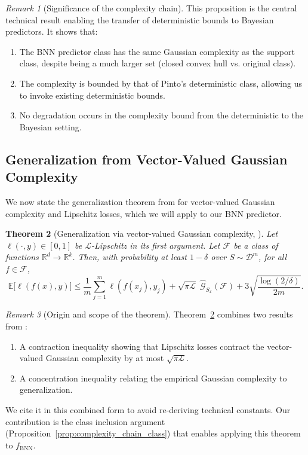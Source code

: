 \documentclass{article}
\theoremstyle{plain}
\newtheorem{theorem}{Theorem}[section]
\theoremstyle{definition}
\theoremstyle{remark}
\newtheorem{remark}[theorem]{Remark}
\begin{document}
\begin{remark}[Significance of the complexity chain]
This proposition is the central technical result enabling the transfer of deterministic bounds to Bayesian predictors. It shows that:
\begin{enumerate}
    \item The BNN predictor class has the same Gaussian complexity as the support class, despite being a much larger set (closed convex hull vs. original class).
    \item The complexity is bounded by that of Pinto's deterministic class, allowing us to invoke existing deterministic bounds.
    \item No degradation occurs in the complexity bound from the deterministic to the Bayesian setting.
\end{enumerate}
\end{remark}

\subsection{Generalization from Vector-Valued Gaussian Complexity}\label{app:gaussian_complexity:generalization}

We now state the generalization theorem from \citet{pinto2025on} for vector-valued Gaussian complexity and Lipschitz losses, which we will apply to our BNN predictor.

\begin{theorem}[Generalization via vector-valued Gaussian complexity, \citet{pinto2025on}]
\label{thm:pinto_generalization}
Let $\ell(\cdot,y)\in[0,1]$ be $\mathcal{L}$-Lipschitz in its first argument. Let $\mathcal{F}$ be a class of functions $\mathbb{R}^d\to\mathbb{R}^k$. Then, with probability at least $1-\delta$ over $S\sim\mathcal{D}^m$, for all $f\in\mathcal{F}$,
\[
\mathbb{E}\big[\ell(f(x),y)\big]
\le
\frac{1}{m}\sum_{j=1}^m \ell(f(x_j),y_j)
+
\sqrt{\pi\mathcal{L}}\;\hat{\mathcal{G}}_{S_x}(\mathcal{F})
+
3\sqrt{\frac{\log(2/\delta)}{2m}}.
\]
\end{theorem}

\begin{remark}[Origin and scope of the theorem]
Theorem~\ref{thm:pinto_generalization} combines two results from \citet{pinto2025on}:
\begin{enumerate}
    \item A contraction inequality showing that Lipschitz losses contract the vector-valued Gaussian complexity by at most $\sqrt{\pi\mathcal{L}}$.
    \item A concentration inequality relating the empirical Gaussian complexity to generalization.
\end{enumerate}
We cite it in this combined form to avoid re-deriving technical constants. Our contribution is the class inclusion argument (Proposition~\ref{prop:complexity_chain_class}) that enables applying this theorem to $f_{\mathrm{BNN}}$.
\end{remark}
\end{document}
